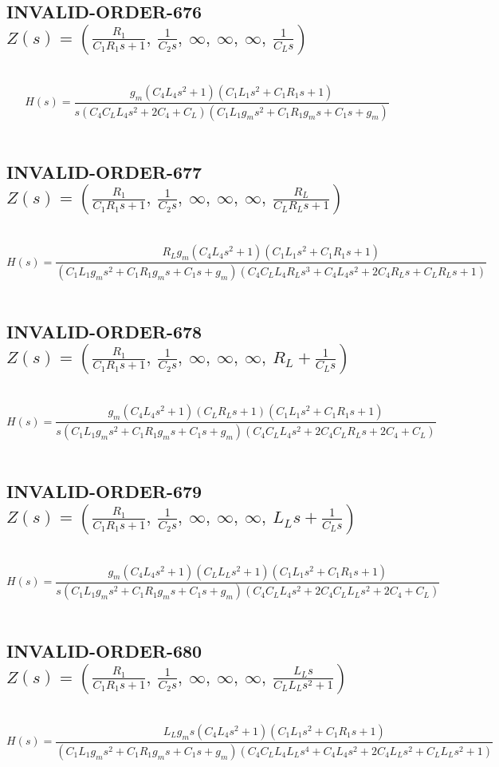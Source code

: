 \documentclass{article}
\begin{document}
\subsection{INVALID-ORDER-676 $Z(s) = \left( \frac{R_{1}}{C_{1} R_{1} s + 1}, \  \frac{1}{C_{2} s}, \  \infty, \  \infty, \  \infty, \  \frac{1}{C_{L} s}\right)$ } \ 
\textbf{\[H(s) = \frac{g_{m} \left(C_{4} L_{4} s^{2} + 1\right) \left(C_{1} L_{1} s^{2} + C_{1} R_{1} s + 1\right)}{s \left(C_{4} C_{L} L_{4} s^{2} + 2 C_{4} + C_{L}\right) \left(C_{1} L_{1} g_{m} s^{2} + C_{1} R_{1} g_{m} s + C_{1} s + g_{m}\right)}\] } \ 
\subsection{INVALID-ORDER-677 $Z(s) = \left( \frac{R_{1}}{C_{1} R_{1} s + 1}, \  \frac{1}{C_{2} s}, \  \infty, \  \infty, \  \infty, \  \frac{R_{L}}{C_{L} R_{L} s + 1}\right)$ } \ 
\textbf{\[H(s) = \frac{R_{L} g_{m} \left(C_{4} L_{4} s^{2} + 1\right) \left(C_{1} L_{1} s^{2} + C_{1} R_{1} s + 1\right)}{\left(C_{1} L_{1} g_{m} s^{2} + C_{1} R_{1} g_{m} s + C_{1} s + g_{m}\right) \left(C_{4} C_{L} L_{4} R_{L} s^{3} + C_{4} L_{4} s^{2} + 2 C_{4} R_{L} s + C_{L} R_{L} s + 1\right)}\] } \ 
\subsection{INVALID-ORDER-678 $Z(s) = \left( \frac{R_{1}}{C_{1} R_{1} s + 1}, \  \frac{1}{C_{2} s}, \  \infty, \  \infty, \  \infty, \  R_{L} + \frac{1}{C_{L} s}\right)$ } \ 
\textbf{\[H(s) = \frac{g_{m} \left(C_{4} L_{4} s^{2} + 1\right) \left(C_{L} R_{L} s + 1\right) \left(C_{1} L_{1} s^{2} + C_{1} R_{1} s + 1\right)}{s \left(C_{1} L_{1} g_{m} s^{2} + C_{1} R_{1} g_{m} s + C_{1} s + g_{m}\right) \left(C_{4} C_{L} L_{4} s^{2} + 2 C_{4} C_{L} R_{L} s + 2 C_{4} + C_{L}\right)}\] } \ 
\subsection{INVALID-ORDER-679 $Z(s) = \left( \frac{R_{1}}{C_{1} R_{1} s + 1}, \  \frac{1}{C_{2} s}, \  \infty, \  \infty, \  \infty, \  L_{L} s + \frac{1}{C_{L} s}\right)$ } \ 
\textbf{\[H(s) = \frac{g_{m} \left(C_{4} L_{4} s^{2} + 1\right) \left(C_{L} L_{L} s^{2} + 1\right) \left(C_{1} L_{1} s^{2} + C_{1} R_{1} s + 1\right)}{s \left(C_{1} L_{1} g_{m} s^{2} + C_{1} R_{1} g_{m} s + C_{1} s + g_{m}\right) \left(C_{4} C_{L} L_{4} s^{2} + 2 C_{4} C_{L} L_{L} s^{2} + 2 C_{4} + C_{L}\right)}\] } \ 
\subsection{INVALID-ORDER-680 $Z(s) = \left( \frac{R_{1}}{C_{1} R_{1} s + 1}, \  \frac{1}{C_{2} s}, \  \infty, \  \infty, \  \infty, \  \frac{L_{L} s}{C_{L} L_{L} s^{2} + 1}\right)$ } \ 
\textbf{\[H(s) = \frac{L_{L} g_{m} s \left(C_{4} L_{4} s^{2} + 1\right) \left(C_{1} L_{1} s^{2} + C_{1} R_{1} s + 1\right)}{\left(C_{1} L_{1} g_{m} s^{2} + C_{1} R_{1} g_{m} s + C_{1} s + g_{m}\right) \left(C_{4} C_{L} L_{4} L_{L} s^{4} + C_{4} L_{4} s^{2} + 2 C_{4} L_{L} s^{2} + C_{L} L_{L} s^{2} + 1\right)}\] } \ 
\end{document}
